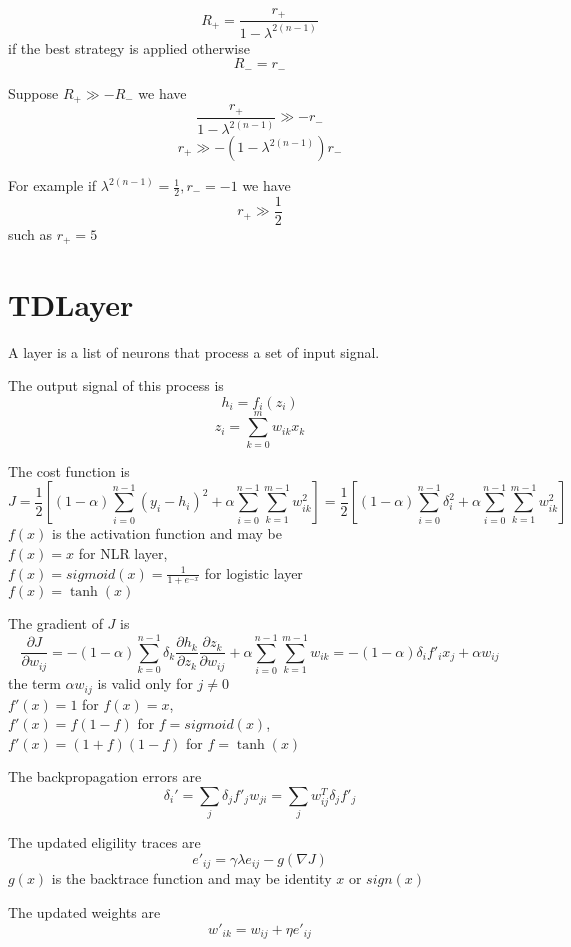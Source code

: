 \documentclass[a4paper,11pt]{article}
\begin{document}
\[ 
	R_+ = \frac{r_+}{1 - \lambda ^ {2 (n -1)}}
 \]
if the best strategy is applied otherwise 
\[ 
R_- = r_-
\]

Suppose $ R_+ \gg -R_- $ we have 
\[ 
	\frac{r_+}{1 - \lambda ^ {2 (n -1)}} \gg -r_-
\]
\[ 
	r_+ \gg -(1 - \lambda ^ {2 (n -1)}) r_-
\]

For example if $ \lambda ^ {2 (n -1)} = \frac{1}{2}, r_- = -1 $ we have 
\[ 
r_+ \gg \frac{1}{2}
\]
such as $ r_+ = 5 $


\section{TDLayer}

A layer is a list of neurons that process a set of input signal.

The output signal of this process is
\[
	h_i = f_i(z_i)
\]
\[
	z_i = \sum_{k=0}^{m} w_{ik} x_k
\]

The cost function is
\[
	J
	= \frac{1}{2} \left[ (1-\alpha) \sum_{i=0}^{n-1} (y_i - h_i)^2
		+ \alpha \sum_{i=0}^{n-1} \sum_{k=1}^{m-1} w^2_{ik} \right]
	= \frac{1}{2} \left[ (1-\alpha) \sum_{i=0}^{n-1} \delta_i^2
		+ \alpha \sum_{i=0}^{n-1} \sum_{k=1}^{m-1} w^2_{ik} \right]
\]
$ f(x) $ is the activation function and may be
\\
$ f(x) = x $ for NLR layer,
\\
$ f(x) = sigmoid(x) = \frac{1}{1+e^{-x}} $ for logistic layer
\\
$ f(x) = \tanh(x) $

The gradient of $ J $ is
\[
	\frac{\partial J}{\partial w_{ij}}
		= -(1-\alpha) \sum_{k=0}^{n-1} \delta_k \frac{\partial h_k}{\partial z_k} \frac{\partial z_k}{\partial w_{ij}}
			+ \alpha \sum_{i=0}^{n-1} \sum_{k=1}^{m-1} w_{ik}
		= -(1-\alpha) \delta_i f'_i x_j 
			+ \alpha w_{ij}
\]
the term $ \alpha w_{ij} $ is valid only for $ j \ne 0 $
\\
$ f'(x) = 1 $ for $ f(x) = x $,
\\
$ f'(x) = f (1 - f)  $ for $ f = sigmoid(x) $,
\\
$ f'(x) = (1 + f) (1 - f)  $ for $ f = \tanh(x) $

The backpropagation errors are
\[
	\delta_i'
		= \sum_{j} \delta_j f'_j w_{ji}
		= \sum_{j} w^T_{ij} \delta_j f'_j
\]

The updated eligility traces are
\[
	e'_{ij}
		= \gamma \lambda e_{ij} - g(\nabla J)
\]
$ g(x) $ is the backtrace function and may be identity $ x $ or $ sign(x) $

The updated weights are
\[
	w'_{ik}
		= w_{ij} + \eta e'_{ij}
\]
\end{document}
